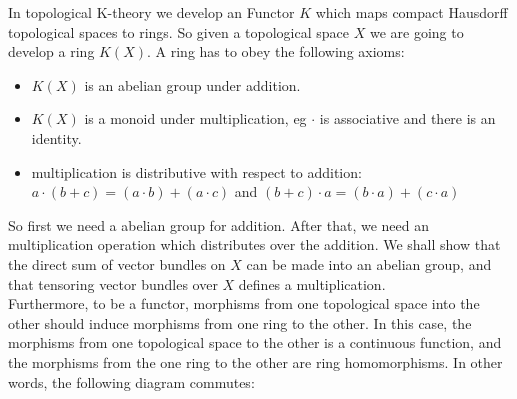 \documentclass[../Thesis.tex]{subfiles}
\begin{document}
In topological K-theory we develop an Functor $K$ which maps compact Hausdorff topological spaces to rings. So given a topological space $X$ we are going to develop a ring $K(X)$. A ring has to obey the following axioms:
\begin{itemize}
\item $K(X)$ is an abelian group under addition.
\item $K(X)$ is a monoid under multiplication, eg $\cdot$ is associative and there is an identity.
\item multiplication is distributive with respect to addition: $a\cdot ( b+c) = (a\cdot b) + (a \cdot c)$ and $(b+c)\cdot a = (b\cdot a) + (c \cdot a)$
\end{itemize}




So first we need a abelian group for addition. After that, we need an multiplication operation which distributes over the addition. We shall show that the direct sum of vector bundles on $X$ can be made into an abelian group, and that tensoring vector bundles over $X$ defines a multiplication.
\\Furthermore, to be a functor, morphisms from one topological space into the other should induce morphisms from one ring to the other. In this case, the morphisms from one topological space to the other is a continuous function, and the morphisms from the one ring to the other are ring homomorphisms. In other words, the following diagram commutes:\\\newline

\end{document}
